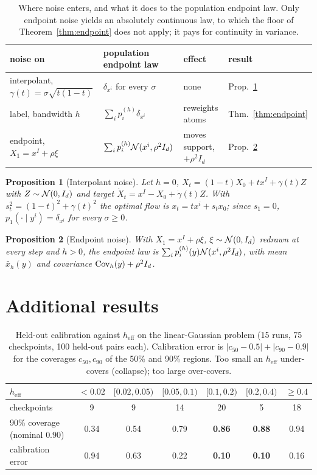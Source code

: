 \documentclass{article}
\theoremstyle{plain}
\newtheorem{proposition}{Proposition}
\theoremstyle{remark}
\begin{document}
\begin{table}[t]
\centering\small
\begin{tabular}{@{}llll@{}}
\toprule
noise on & population endpoint law & effect & result\\
\midrule
interpolant, $\gamma(t)=\sigma\sqrt{t(1-t)}$ & $\delta_{x^i}$ for every $\sigma$ & none &
Prop.~\ref{prop:interp}\\
label, bandwidth $h$ & $\sum_ip_i^{(h)}\delta_{x^i}$ & reweights atoms &
Thm.~\ref{thm:endpoint}\\
endpoint, $X_1=x^I+\rho\xi$ & $\sum_ip_i^{(h)}\mathcal{N}(x^i,\rho^2I_d)$ & moves support,
$+\rho^2I_d$ & Prop.~\ref{prop:endpointnoise}\\
\bottomrule
\end{tabular}
\caption{Where noise enters, and what it does to the population endpoint law. Only
endpoint noise yields an absolutely continuous law, to which the floor of Theorem~\ref{thm:endpoint} does not
apply; it pays for continuity in variance.}
\label{tab:interventions}
\end{table}

\begin{proposition}[Interpolant noise]
\label{prop:interp}
Let $h=0$, $X_t=(1-t)X_0+tx^I+\gamma(t)Z$ with $Z\sim\mathcal{N}(0,I_d)$ and target
$\dot X_t=x^I-X_0+\dot\gamma(t)Z$. With $s_t^2=(1-t)^2+\gamma(t)^2$ the optimal flow is
$x_t=tx^i+s_tx_0$; since $s_1=0$, $p_1(\cdot\mid y^i)=\delta_{x^i}$ for every
$\sigma\ge0$.
\end{proposition}

\begin{proposition}[Endpoint noise]
\label{prop:endpointnoise}
With $X_1=x^I+\rho\xi$, $\xi\sim\mathcal{N}(0,I_d)$ redrawn at every step and $h>0$, the endpoint
law is $\sum_ip_i^{(h)}(y)\mathcal{N}(x^i,\rho^2I_d)$, with mean $\bar x_h(y)$ and covariance
$\operatorname{Cov}_h(y)+\rho^2I_d$.
\end{proposition}

\section{Additional results}
\label{app:results}

\begin{table}[t]
\centering\small
\begin{tabular}{lcccccc}
\toprule
$h_{\mathrm{eff}}$ & $<0.02$ & $[0.02,0.05)$ & $[0.05,0.1)$ & $[0.1,0.2)$ & $[0.2,0.4)$ &
$\ge0.4$\\
\midrule
checkpoints & 9 & 9 & 14 & 20 & 5 & 18\\
90\% coverage (nominal $0.90$) & 0.34 & 0.54 & 0.79 & \textbf{0.86} & \textbf{0.88} & 0.94\\
calibration error & 0.94 & 0.63 & 0.22 & \textbf{0.10} & \textbf{0.10} & 0.16\\
\bottomrule
\end{tabular}
\caption{Held-out calibration against $h_{\mathrm{eff}}$ on the linear-Gaussian problem
(15 runs, 75 checkpoints, 100 held-out pairs each). Calibration error is
$|c_{50}-0.5|+|c_{90}-0.9|$ for the coverages $c_{50},c_{90}$ of the 50\% and 90\%
regions. Too small an $h_{\mathrm{eff}}$ under-covers (collapse); too large
over-covers.}
\label{tab:calib}
\end{table}
\end{document}
